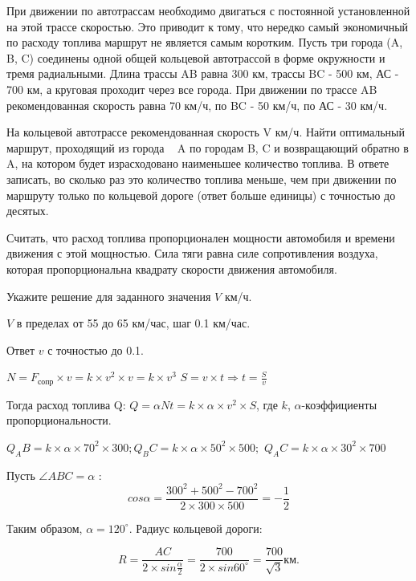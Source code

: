 
При движении по автотрассам необходимо двигаться с постоянной
установленной на этой трассе скоростью. Это приводит к тому, что нередко самый
экономичный по расходу топлива маршрут не является самым коротким.  Пусть три города (A, B, C) 
соединены одной общей кольцевой
автотрассой в форме окружности и тремя радиальными.  Длина трассы AB
равна 300 км, трассы BC - 500 км, АС - 700
км, а круговая проходит через все города. 
При движении по трассе AB рекомендованная
скорость равна 70 км/ч, по BC - 50 км/ч, по АС - 30 км/ч. 

На кольцевой автотрассе рекомендованная скорость V км/ч. Найти оптимальный маршрут, проходящий из города   A по городам B, C и возвращающий обратно в A, на котором будет израсходовано наименьшее количество топлива. В
ответе записать, во сколько раз это количество топлива меньше, чем при движении
по маршруту только по кольцевой дороге (ответ больше единицы) с точностью до десятых.

Считать, что
расход топлива пропорционален мощности автомобиля и времени движения с этой мощностью. Сила тяги равна силе сопротивления воздуха, которая пропорциональна квадрату скорости
движения автомобиля.

Укажите решение для заданного значения $V$ км/ч.

\paramSection

$V$ в пределах от 55 до 65 км/час, шаг 0.1 км/час. 

Ответ $v$ с точностью до 0.1.

\solutionSection

$N=F_{\text{сопр}} \times v=k \times v^2 \times v=k \times v^3$                         $S=v \times t \Rightarrow t=\frac{S}{v} $ 

Тогда расход топлива Q:   $Q=\alpha Nt=k \times \alpha  \times v^2 \times S$, где $k$, $\alpha $-коэффициенты 
пропорциональности. 

$Q_AB=k \times \alpha  \times 70^2 \times 300; Q_BC=k \times \alpha  \times 50^2 \times 500; $
$Q_AC=k \times \alpha  \times 30^2 \times 700$

Пусть $\angle ABC=\alpha$ : $$cos\alpha = \frac{300^2+500^2-700^2}{2 \times 300 \times 500}=-\frac{1}{2}$$

Таким образом, $\alpha =120^{\circ}$.  Радиус кольцевой дороги: 

$$R=\frac{AC}{2 \times sin\frac{\alpha}{2}}= \frac{700}{2 \times sin60^{\circ}}=\frac{700}{\sqrt{3}} \text{км}.$$

